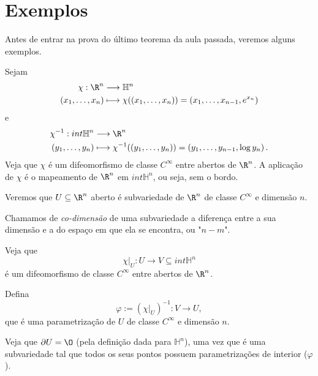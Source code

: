 
\section*{Exemplos}

Antes de entrar na prova do último teorema da aula passada, veremos alguns exemplos.

\begin{remark}
    Sejam
    \begin{align*}
        \chi: \R^{n} &\longrightarrow \mathbb{H}^{n} \\
        \left( x_1,\ldots,x_n \right)  &\longmapsto \chi(\left( x_1,\ldots,x_n \right) ) = \left( x_1,\ldots,x_{n-1}, e^{x_n} \right) 
    \end{align*}
    e
    \begin{align*}
        \chi^{-1}: int \mathbb{H}^{n} &\longrightarrow \R^{n} \\
        \left( y_1,\ldots,y_n \right)  &\longmapsto \chi^{-1}(\left( y_1,\ldots,y_n \right) ) = \left( y_1,\ldots,y_{n-1},\log y_n \right) 
    .\end{align*}
    Veja que $\chi$ é um difeomorfismo de classe $C^{\infty}$ entre abertos de $\R^{n}$. A aplicação de $\chi$ é o mapeamento de $\R^{n}$ em $ int\mathbb{H}^{n}$, ou seja, sem o bordo.
\end{remark}

\begin{eg}
    Veremos que $U\subseteq\R^{n}$ aberto é subvariedade de $\R^{n}$ de classe $C^{\infty}$ e dimensão $n$.

    \begin{note}
        Chamamos de \emph{co-dimensão} de uma subvariedade a diferença entre a sua dimensão e a do espaço em que ela se encontra, ou "$n-m$".
    \end{note}

    Veja que \[
    \chi\Big|_{U}: U \longrightarrow V\subseteq int \mathbb{H}^{n}
    \] é um difeomorfismo de classe $C^{\infty}$ entre abertos de $\R^{n}$.

    Defina \[
    \varphi := \left( \chi\Big|_U \right) ^{-1} : V \longrightarrow U
    ,\] que é uma parametrização de $U$ de classe $C^{\infty}$ e dimensão $n$.

    Veja que $\partial U = \O$ (pela definição dada para $\mathbb{H}^{n}$), uma vez que é uma subvariedade tal que todos os seus pontos possuem parametrizações de interior ($\varphi $).
\end{eg}

